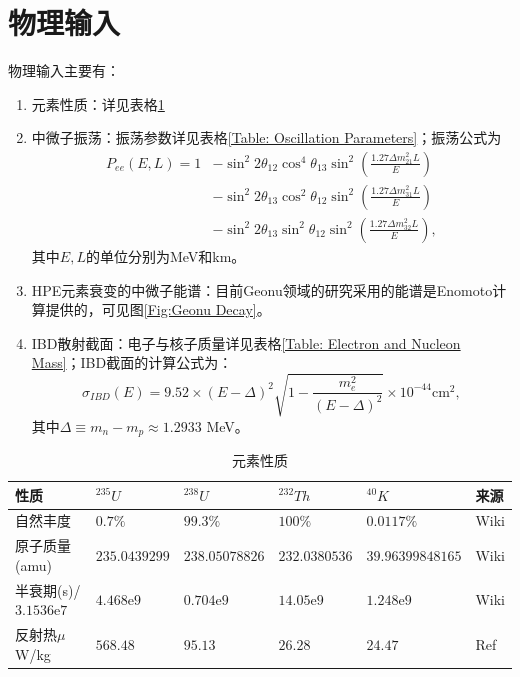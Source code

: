 		\section{物理输入}
			物理输入主要有：
				\begin{enumerate}
					\item 元素性质：详见表格\ref{Table: Element Properties}
					\item 中微子振荡：振荡参数详见表格\ref{Table: Oscillation Parameters}；振荡公式为
						\begin{equation}
							\begin{aligned}
								P_{ee}(E, L)
								= 1  
								&- \sin^2 2\theta_{12}\cos^4 \theta_{13} \sin^2\left(\frac{1.27 \Delta m_{21}^2 L}{E}\right) \\
								&- \sin^2 2\theta_{13}\cos^2 \theta_{12} \sin^2\left(\frac{1.27 \Delta m_{31}^2 L}{E}\right) \\
								&- \sin^2 2\theta_{13}\sin^2 \theta_{12} \sin^2\left(\frac{1.27 \Delta m_{32}^2 L}{E}\right),
							\end{aligned}
						\end{equation}
					其中$E, L$的单位分别为MeV和km。
					\item HPE元素衰变的中微子能谱：目前Geonu领域的研究采用的能谱是Enomoto计算提供的\cite{Enomoto_Spectrum}，可见图\ref{Fig:Geonu Decay}。
					\item IBD散射截面：电子与核子质量详见表格\ref{Table: Electron and Nucleon Mass}；IBD截面的计算公式为：
						\begin{equation}
							\sigma_{IBD}(E)
							= 9.52 \times (E - \Delta)^2 \sqrt{1 - \frac{m_e^2}{(E - \Delta)^2}} \times 10^{-44} \text{cm}^2,
						\end{equation}
					其中$\Delta \equiv m_n - m_p \approx 1.2933$ MeV。
				\end{enumerate}
				\begin{table}[H]
					\centering
					\caption{元素性质}
					\begin{tabular}{p{3.5cm}|p{2cm}p{2cm}p{2cm}p{3cm}|p{2cm}}
						\hline
						\hline
						性质 & ${}^{235}U$ & ${}^{238}U$ & ${}^{232}Th$ & ${}^{40}K$ & 来源\\
						\hline
						自然丰度 & $0.7\%$ & $99.3\%$ & $100\%$ & $0.0117\%$ & Wiki\\
						\hline
						原子质量(amu) & $235.0439299$& $238.05078826$ & $232.0380536$ & $39.96399848165$ & Wiki \\
						\hline
						半衰期(s)/$3.1536$e$7$ & $4.468$e$9$ & $0.704$e$9$ & $14.05$e$9$ & $1.248$e$9$ & Wiki \\
						\hline
						反射热$\mu$W/kg & $568.48$ & $95.13$ & $26.28$ & $24.47$ & Ref \cite{dye2012geoneutrinos}\\
						\hline
						\hline
					\end{tabular}
					\label{Table: Element Properties}
				\end{table}
